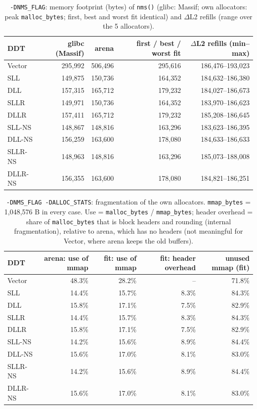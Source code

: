 \documentclass[11pt,a4paper]{article}
\begin{document}
\begin{table}[H]
\centering
\caption{\texttt{-DNMS\_FLAG}: memory footprint (bytes) of \texttt{nms()} (glibc: Massif; own allocators: peak \texttt{malloc\_bytes}; first, best and worst fit identical) and $\Delta$L2 refills (range over the 5 allocators).}
\label{tab:q4_mem}
\begin{tabular}{@{}lrrrr@{}}
\toprule
DDT & glibc (Massif) & arena & first / best / worst fit & $\Delta$L2 refills (min--max) \\
\midrule
Vector & 295{,}992 & 506{,}496 & 295{,}616 & 186{,}476--193{,}023 \\
SLL & 149{,}875 & 150{,}736 & 164{,}352 & 184{,}632--186{,}380 \\
DLL & 157{,}315 & 165{,}712 & 179{,}232 & 184{,}027--186{,}673 \\
SLLR & 149{,}971 & 150{,}736 & 164{,}352 & 183{,}970--186{,}623 \\
DLLR & 157{,}411 & 165{,}712 & 179{,}232 & 185{,}208--186{,}645 \\
SLL-NS & 148{,}867 & 148{,}816 & 163{,}296 & 183{,}623--186{,}395 \\
DLL-NS & 156{,}259 & 163{,}600 & 178{,}080 & 184{,}633--186{,}633 \\
SLLR-NS & 148{,}963 & 148{,}816 & 163{,}296 & 185{,}073--188{,}008 \\
DLLR-NS & 156{,}355 & 163{,}600 & 178{,}080 & 184{,}821--186{,}251 \\
\bottomrule
\end{tabular}
\end{table}

\begin{table}[H]
\centering
\caption{\texttt{-DNMS\_FLAG -DALLOC\_STATS}: fragmentation of the own allocators. \texttt{mmap\_bytes} = 1{,}048{,}576 B in every case. Use = \texttt{malloc\_bytes} / \texttt{mmap\_bytes}; header overhead = share of \texttt{malloc\_bytes} that is block headers and rounding (internal fragmentation), relative to arena, which has no headers (not meaningful for Vector, where arena keeps the old buffers).}
\label{tab:q4_frag}
\begin{tabular}{@{}lrrrr@{}}
\toprule
DDT & arena: use of mmap & fit: use of mmap & fit: header overhead & unused mmap (fit) \\
\midrule
Vector & 48.3\% & 28.2\% & -- & 71.8\% \\
SLL & 14.4\% & 15.7\% & 8.3\% & 84.3\% \\
DLL & 15.8\% & 17.1\% & 7.5\% & 82.9\% \\
SLLR & 14.4\% & 15.7\% & 8.3\% & 84.3\% \\
DLLR & 15.8\% & 17.1\% & 7.5\% & 82.9\% \\
SLL-NS & 14.2\% & 15.6\% & 8.9\% & 84.4\% \\
DLL-NS & 15.6\% & 17.0\% & 8.1\% & 83.0\% \\
SLLR-NS & 14.2\% & 15.6\% & 8.9\% & 84.4\% \\
DLLR-NS & 15.6\% & 17.0\% & 8.1\% & 83.0\% \\
\bottomrule
\end{tabular}
\end{table}
\end{document}
